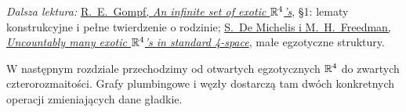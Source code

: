 \par\smallskip
{\footnotesize\noindent\emph{Dalsza lektura:}
\href{https://doi.org/10.4310/jdg/1214439566}
{R.~E.~Gompf, \emph{An infinite set of exotic $\mathbb{R}^4$'s}},
§1: lematy konstrukcyjne i pełne twierdzenie o rodzinie;
\href{https://doi.org/10.4310/jdg/1214447810}
{S.~De Michelis i M.~H.~Freedman,
\emph{Uncountably many exotic $\mathbb{R}^4$'s in standard 4-space}},
małe egzotyczne struktury.\par}

W następnym rozdziale przechodzimy od otwartych
egzotycznych $\mathbb{R}^4$ do zwartych czterorozmaitości.
Grafy plumbingowe i węzły dostarczą tam dwóch
konkretnych operacji zmieniających dane gładkie.
